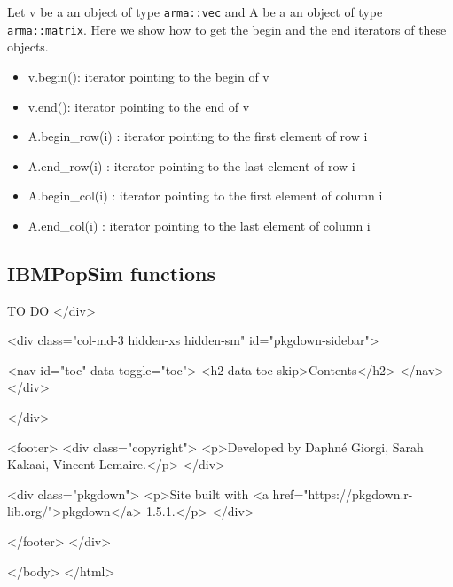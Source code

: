 Let v be a an object of type \texttt{arma::vec} and A be a an object of type \texttt{arma::matrix}. Here we show how to get the begin and the end iterators of these objects.

\begin{itemize}
\tightlist
\item
  v.begin(): iterator pointing to the begin of v
\item
  v.end(): iterator pointing to the end of v
\item
  A.begin\_row(i) : iterator pointing to the first element of row i
\item
  A.end\_row(i) : iterator pointing to the last element of row i
\item
  A.begin\_col(i) : iterator pointing to the first element of column i
\item
  A.end\_col(i) : iterator pointing to the last element of column i
\end{itemize}

\hypertarget{IBMfunctions}{%
\subsection{IBMPopSim functions}\label{IBMfunctions}}

{ TO DO }
  </div>

  <div class="col-md-3 hidden-xs hidden-sm" id="pkgdown-sidebar">

        <nav id="toc" data-toggle="toc">
      <h2 data-toc-skip>Contents</h2>
    </nav>
      </div>

</div>



      <footer>
      <div class="copyright">
  <p>Developed by Daphné Giorgi, Sarah Kakaai, Vincent Lemaire.</p>
</div>

<div class="pkgdown">
  <p>Site built with <a href="https://pkgdown.r-lib.org/">pkgdown</a> 1.5.1.</p>
</div>

      </footer>
   </div>

  


  </body>
</html>

